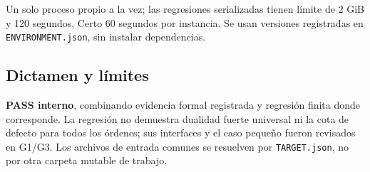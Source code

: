 \documentclass[11pt]{article}
\begin{document}
Un solo proceso propio a la vez; las regresiones serializadas tienen
límite de 2 GiB y 120 segundos, Certo 60 segundos por instancia. Se usan
versiones registradas en \nolinkurl{ENVIRONMENT.json}, sin instalar
dependencias.

\subsection{Dictamen y límites}\label{dictamen-y-luxedmites}

\textbf{PASS interno}, combinando evidencia formal registrada y
regresión finita donde corresponde. La regresión no demuestra dualidad
fuerte universal ni la cota de defecto para todos los órdenes; sus
interfaces y el caso pequeño fueron revisados en G1/G3. Los archivos de
entrada comunes se resuelven por \nolinkurl{TARGET.json}, no por otra
carpeta mutable de trabajo.
\end{document}
